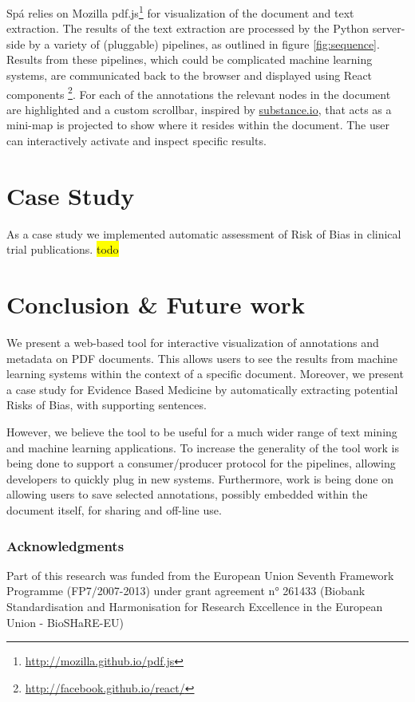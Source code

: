 \documentclass[runningheads,a4paper]{llncs}
\newcommand{\highlight}[1]{\colorbox{yellow}{#1}}
\begin{document}
Spá relies on Mozilla pdf.js\footnote{\url{http://mozilla.github.io/pdf.js}} for visualization of the document and text extraction.
The results of the text extraction are processed by the Python server-side by a variety of (pluggable) pipelines, as outlined in figure \ref{fig:sequence}.
Results from these pipelines, which could be complicated machine learning systems, are communicated back to the browser and displayed using React components \footnote{\url{http://facebook.github.io/react/}}.
For each of the annotations the relevant nodes in the document are highlighted and a custom scrollbar, inspired by \href{http://substance.io/}{substance.io}, that acts as a mini-map is projected to show where it resides within the document.
The user can interactively activate and inspect specific results.
\section{Case Study}
\label{sec-3}
As a case study we implemented automatic assessment of Risk of Bias in clinical trial publications.
\highlight{todo}
\section{Conclusion \& Future work}
\label{sec-4}
We present a web-based tool for interactive visualization of annotations and metadata on PDF documents.
This allows users to see the results from machine learning systems within the context of a specific document.
Moreover, we present a case study for Evidence Based Medicine by automatically extracting potential Risks of Bias, with supporting sentences.

However, we believe the tool to be useful for a much wider range of text mining and machine learning applications.
To increase the generality of the tool work is being done to support a consumer/producer protocol for the pipelines, allowing developers to quickly plug in new systems.
Furthermore, work is being done on allowing users to save selected annotations, possibly embedded within the document itself, for sharing and off-line use.

\subsubsection{Acknowledgments}
\label{sec-4-0-1}
Part of this research was funded from the European Union Seventh Framework Programme (FP7/2007-2013) under grant agreement n° 261433 (Biobank Standardisation and Harmonisation for Research Excellence in the European Union - BioSHaRE-EU)



\end{document}
